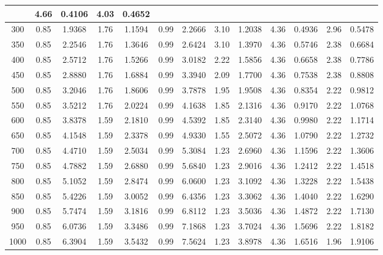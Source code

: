\documentclass[12pt]{article}
\begin{document}
\begin{table}[H]
{\begin{tabular}{ |c |c | c | c | c | c | c | c | c | c | c | c | c | }
      & 4.66 & 0.4106 & 4.03 & 0.4652 \\ \hline
      300
      & 0.85 & 1.9368 & 1.76 & 1.1594
      & 0.99 & 2.2666 & 3.10 & 1.2038
      & 4.36 & 0.4936 & 2.96 & 0.5478 \\ \hline
      350
      & 0.85 & 2.2546 & 1.76 & 1.3646
      & 0.99 & 2.6424 & 3.10 & 1.3970
      & 4.36 & 0.5746 & 2.38 & 0.6684 \\ \hline
      400
      & 0.85 & 2.5712 & 1.76 & 1.5266
      & 0.99 & 3.0182 & 2.22 & 1.5856
      & 4.36 & 0.6658 & 2.38 & 0.7786 \\ \hline
      450
      & 0.85 & 2.8880 & 1.76 & 1.6884
      & 0.99 & 3.3940 & 2.09 & 1.7700
      & 4.36 & 0.7538 & 2.38 & 0.8808 \\ \hline
      500
      & 0.85 & 3.2046 & 1.76 & 1.8606
      & 0.99 & 3.7878 & 1.95 & 1.9508
      & 4.36 & 0.8354 & 2.22 & 0.9812 \\ \hline
      550
      & 0.85 & 3.5212 & 1.76 & 2.0224
      & 0.99 & 4.1638 & 1.85 & 2.1316
      & 4.36 & 0.9170 & 2.22 & 1.0768 \\ \hline
      600
      & 0.85 & 3.8378 & 1.59 & 2.1810
      & 0.99 & 4.5392 & 1.85 & 2.3140
      & 4.36 & 0.9980 & 2.22 & 1.1714 \\ \hline
      650
      & 0.85 & 4.1548 & 1.59 & 2.3378
      & 0.99 & 4.9330 & 1.55 & 2.5072
      & 4.36 & 1.0790 & 2.22 & 1.2732 \\ \hline
      700
      & 0.85 & 4.4710 & 1.59 & 2.5034
      & 0.99 & 5.3084 & 1.23 & 2.6960
      & 4.36 & 1.1596 & 2.22 & 1.3606 \\ \hline
      750
      & 0.85 & 4.7882 & 1.59 & 2.6880
      & 0.99 & 5.6840 & 1.23 & 2.9016
      & 4.36 & 1.2412 & 2.22 & 1.4518 \\ \hline
      800
      & 0.85 & 5.1052 & 1.59 & 2.8474
      & 0.99 & 6.0600 & 1.23 & 3.1092
      & 4.36 & 1.3228 & 2.22 & 1.5438 \\ \hline
      850
      & 0.85 & 5.4226 & 1.59 & 3.0052
      & 0.99 & 6.4356 & 1.23 & 3.3062
      & 4.36 & 1.4040 & 2.22 & 1.6290 \\ \hline
      900
      & 0.85 & 5.7474 & 1.59 & 3.1816
      & 0.99 & 6.8112 & 1.23 & 3.5036
      & 4.36 & 1.4872 & 2.22 & 1.7130 \\ \hline
      950
      & 0.85 & 6.0736 & 1.59 & 3.3486
      & 0.99 & 7.1868 & 1.23 & 3.7024
      & 4.36 & 1.5696 & 2.22 & 1.8182 \\ \hline
      1000
      & 0.85 & 6.3904 & 1.59 & 3.5432
      & 0.99 & 7.5624 & 1.23 & 3.8978
      & 4.36 & 1.6516 & 1.96 & 1.9106 \\ \hline
    \end{tabular}
  }
\end{table}
\end{document}
